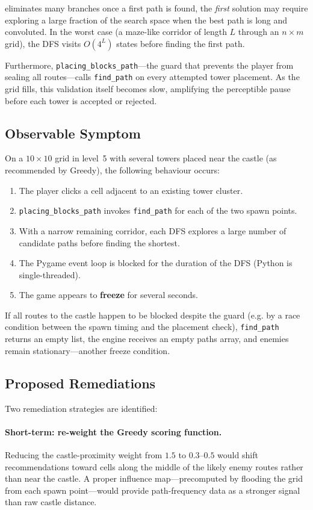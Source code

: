 \documentclass[12pt,a4paper]{report}
\begin{document}
eliminates many branches once a first path is found, the \textit{first}
solution may require exploring a large fraction of the search space when the
best path is long and convoluted.
In the worst case (a maze-like corridor of length $L$ through an $n \times m$
grid), the DFS visits $O(4^L)$ states before finding the first path.

Furthermore, \texttt{placing\_blocks\_path}---the guard that prevents the
player from sealing all routes---calls \texttt{find\_path} on every attempted
tower placement.
As the grid fills, this validation itself becomes slow, amplifying the
perceptible pause before each tower is accepted or rejected.

\subsection{Observable Symptom}

On a $10 \times 10$ grid in level~5 with several towers placed near the
castle (as recommended by Greedy), the following behaviour occurs:
\begin{enumerate}
  \item The player clicks a cell adjacent to an existing tower cluster.
  \item \texttt{placing\_blocks\_path} invokes \texttt{find\_path} for each
        of the two spawn points.
  \item With a narrow remaining corridor, each DFS explores a large number of
        candidate paths before finding the shortest.
  \item The Pygame event loop is blocked for the duration of the DFS
        (Python is single-threaded).
  \item The game appears to \textbf{freeze} for several seconds.
\end{enumerate}
If all routes to the castle happen to be blocked despite the guard (e.g.
by a race condition between the spawn timing and the placement check),
\texttt{find\_path} returns an empty list, the engine receives an empty paths
array, and enemies remain stationary---another freeze condition.

\subsection{Proposed Remediations}

Two remediation strategies are identified:

\paragraph{Short-term: re-weight the Greedy scoring function.}
Reducing the castle-proximity weight from $1.5$ to $0.3$--$0.5$ would shift
recommendations toward cells along the middle of the likely enemy routes
rather than near the castle.
A proper influence map---precomputed by flooding the grid from each spawn
point---would provide path-frequency data as a stronger signal than raw
castle distance.
\end{document}

